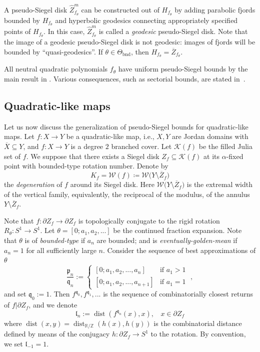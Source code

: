 \documentclass{amsart}
\renewcommand{\sp}{{\ \ }}
\newcommand{\1}{{\mathbb 1 }}
\newcommand{\Width}{{\mathcal W}}
\newcommand{\wZ}{{\widehat Z}}
\newcommand{\length}{{\mathfrak l}}
\newcommand{\R}{\mathbb{R}}
\newcommand{\Z}{\mathbb{Z}}
\theoremstyle{remark}
\numberwithin{equation}{section}
\theoremstyle{definition}
\newcommand{\bnd}{{\mathrm{bnd}}}
\newcommand{\dist}{\operatorname{dist}}
\begin{document}
A pseudo-Siegel disk $\wZ^m_{f_\theta}$ can be constructed out of $H_{f_\theta}$ by adding parabolic fjords bounded by $H_{f_\theta}$ and hyperbolic geodesics connecting appropriately specified points of $H_{f_\theta}$. In this case, $\wZ^m_{f_\theta}$ is called a \emph{geodesic} pseudo-Siegel disk. Note that the image of a geodesic pseudo-Siegel disk is not geodesic: images of fjords will be bounded by ``quasi-geodesics''. If $\theta\in\Theta_\bnd$, then $H_{f_\theta}=\overline Z_{f_\theta}$.



All neutral quadratic polynomials $f_\theta$ have uniform pseudo-Siegel bounds by the main result in \cite{DL22}. Various consequences, such as sectorial bounds, are stated in~\cite{DL:sector bounds}.



\subsection{Quadratic-like maps} 
\label{ss:into:ql maps}
Let us now discuss the generalization of pseudo-Siegel bounds for quadratic-like maps.
Let $f\colon X\to Y$ be a quadratic-like map, i.e., $X, Y$ are Jordan domains with $\overline{X} \subseteq Y$, and $f\colon X\to Y$ is a degree $2$ branched cover.
Let $\mathcal{K}(f)$ be the filled Julia set of $f$. 
We suppose that there exists a Siegel disk $Z_f \subseteq \mathcal{K}(f)$ at its $\alpha$-fixed point with bounded-type rotation number. 
Denote by \[K_f=\Width(f)\coloneqq \Width\big(Y\setminus \overline Z_f\big)\] the {\em degeneration} of $f$ around its Siegel disk. 
Here $\Width\big(Y\setminus \overline Z_f\big)$ is the extremal width of the vertical family, equivalently, the reciprocal of the modulus, of the annulus $Y\setminus \overline Z_f$.

Note that $f: \partial Z_f \longrightarrow \partial Z_f$ is topologically conjugate to the rigid rotation $R_{\theta}: S^1 \longrightarrow S^1$. Let $\theta = [0; a_1,a_2,...]$ be the continued fraction expansion. 
Note that $\theta$ is of {\em bounded-type} if $a_n$ are bounded; and is {\em eventually-golden-mean} if $a_n = 1$ for all sufficiently large $n$.
Consider the sequence of best approximations of $\theta$
\begin{equation}
\label{eq:p_n q_n}
\frac{\mathfrak{p}_n}{\mathfrak{q}_n} := \begin{cases} 
      [0;a_1,a_2,..., a_n] & \text{if } a_1 > 1 \\
      [0;a_1,a_2,..., a_{n+1}] & \text{if } a_1 = 1
   \end{cases}\; ,
\end{equation}
and set $\mathfrak{q}_0 :=1$. Then $f^{\mathfrak{q}_0}, f^{\mathfrak{q}_1},...$ is the sequence of combinatorially closest returns of $f|{\partial Z_f}$, and we denote
$$
\length_n:= \dist(f^{\mathfrak{q}_n}(x), x), \sp \sp x\in \partial Z_f
$$
where $\dist (x,y) = \dist_{\R/\Z}(h(x), h(y))$ is the combinatorial distance defined by means of the conjugacy $h: \partial Z_f \longrightarrow S^1$ to the rotation.
By convention, we set $\length_{-1} = 1$.
\end{document}
